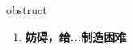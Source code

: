 
\begin{frame}
{\huge obstruct}
\begin{center}
\begin{enumerate}\Large
  \item \textbf{妨碍，给...制造困难}
\end{enumerate}
\end{center}
\end{frame}
